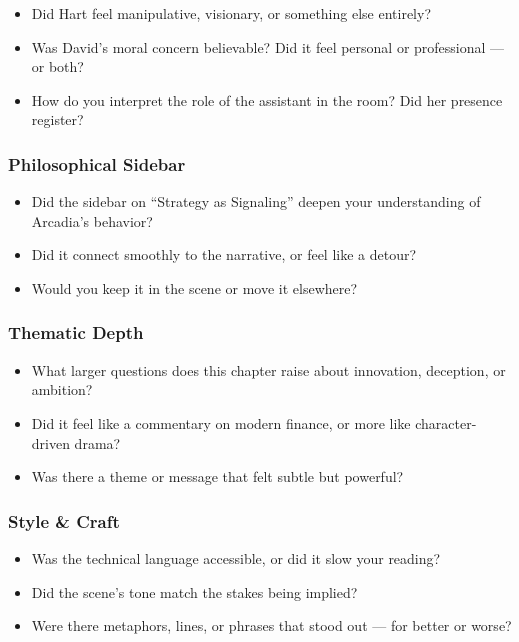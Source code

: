 \begin{itemize}
  \item Did Hart feel manipulative, visionary, or something else entirely?
  \item Was David’s moral concern believable? Did it feel personal or professional — or both?
  \item How do you interpret the role of the assistant in the room? Did her presence register?
\end{itemize}

\subsubsection{Philosophical Sidebar}

\begin{itemize}
  \item Did the sidebar on ``Strategy as Signaling'' deepen your understanding of Arcadia’s behavior?
  \item Did it connect smoothly to the narrative, or feel like a detour?
  \item Would you keep it in the scene or move it elsewhere?
\end{itemize}

\subsubsection{Thematic Depth}

\begin{itemize}
  \item What larger questions does this chapter raise about innovation, deception, or ambition?
  \item Did it feel like a commentary on modern finance, or more like character-driven drama?
  \item Was there a theme or message that felt subtle but powerful?
\end{itemize}

\subsubsection{Style \& Craft}

\begin{itemize}
  \item Was the technical language accessible, or did it slow your reading?
  \item Did the scene’s tone match the stakes being implied?
  \item Were there metaphors, lines, or phrases that stood out — for better or worse?
\end{itemize}

